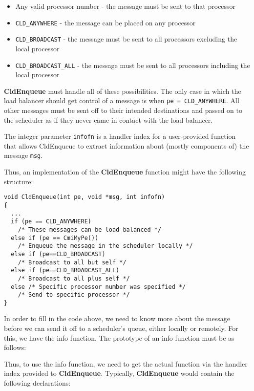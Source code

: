 \begin{itemize}
\item Any valid processor number - the message must be sent to
that processor
\item {\tt CLD\_ANYWHERE} - the message can be placed on any processor
\item {\tt CLD\_BROADCAST} - the message must be sent to all processors
excluding the local processor
\item {\tt CLD\_BROADCAST\_ALL} - the message must be sent to all processors
including the local processor
\end{itemize}

{\bf CldEnqueue} must handle all of these possibilities.  The only
case in which the load balancer should get control of a message is when
{\tt pe = CLD\_ANYWHERE}.  All other messages must be sent off to their
intended destinations and passed on to the scheduler as if they never
came in contact with the load balancer. 

The integer parameter {\tt infofn} is a handler index for a
user-provided function that allows CldEnqueue to extract information about
(mostly components of) the message {\tt msg}.

Thus, an implementation of the {\bf CldEnqueue} function might have
the following structure:

\begin{verbatim}
void CldEnqueue(int pe, void *msg, int infofn)
{
  ...
  if (pe == CLD_ANYWHERE)
    /* These messages can be load balanced */
  else if (pe == CmiMyPe())
    /* Enqueue the message in the scheduler locally */
  else if (pe==CLD_BROADCAST) 
    /* Broadcast to all but self */
  else if (pe==CLD_BROADCAST_ALL)
    /* Broadcast to all plus self */
  else /* Specific processor number was specified */
    /* Send to specific processor */
}
\end{verbatim}

In order to fill in the code above, we need to know more about the
message before we can send it off to a scheduler's queue, either
locally or remotely.  For this, we have the info function.  The
prototype of an info function must be as follows:


Thus, to use the info function, we need to get the actual function via
the handler index provided to {\bf CldEnqueue}.  Typically, {\bf
CldEnqueue} would contain the following declarations:

